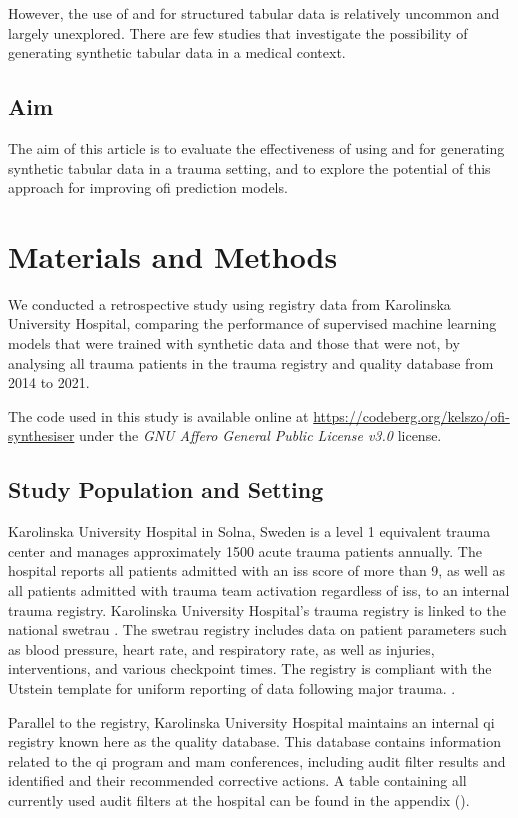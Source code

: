 \documentclass[12pt, a4paper]{article}
\begin{document}
However, the use of  and  for structured tabular data is relatively uncommon and largely unexplored. There are few studies that investigate the possibility of generating synthetic tabular data in a medical context.

\subsection{Aim}
The aim of this article is to evaluate the effectiveness of using  and  for generating synthetic tabular data in a trauma setting, and to explore the potential of this approach for improving \acrshort{ofi} prediction models.

\section{Materials and Methods}
We conducted a retrospective study using registry data from Karolinska University Hospital, comparing the performance of supervised machine learning models that were trained with synthetic data and those that were not, by analysing all trauma patients in the trauma registry and quality database from 2014 to 2021.

The code used in this study is available online at \url{https://codeberg.org/kelszo/ofi-synthesiser} under the \textit{GNU Affero General Public License v3.0} license.

\subsection{Study Population and Setting}
Karolinska University Hospital in Solna, Sweden is a level 1 equivalent trauma center and manages approximately 1500 acute trauma patients annually. The hospital reports all patients admitted with an \acrfull{iss} score of more than 9, as well as all patients admitted with trauma team activation regardless of \acrshort{iss}, to an internal trauma registry. Karolinska University Hospital's trauma registry is linked to the national \acrfull{swetrau} \cite{swetrau}. The \acrshort{swetrau} registry includes data on patient parameters such as blood pressure, heart rate, and respiratory rate, as well as injuries, interventions, and various checkpoint times. The registry is compliant with the Utstein template for uniform reporting of data following major trauma. \cite{ringdal_utstein_2008}.

Parallel to the registry, Karolinska University Hospital maintains an internal \acrshort{qi} registry known here as the quality database.  This database contains information related to the \acrshort{qi} program and \acrshort{mam} conferences, including audit filter results and identified  and their recommended corrective actions. A table containing all currently used audit filters at the hospital can be found in the appendix ().
\end{document}
